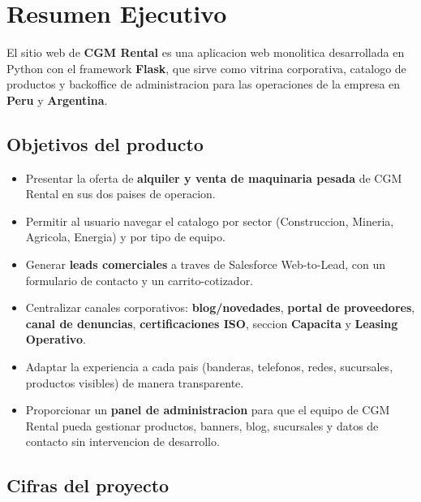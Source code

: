 \documentclass[11pt,a4paper]{article}
\begin{document}
\vspace{0.4cm}
\tableofcontents
\newpage

\section{Resumen Ejecutivo}

El sitio web de \textbf{CGM Rental} es una aplicacion web monolitica
desarrollada en Python con el framework \textbf{Flask}, que sirve como vitrina
corporativa, catalogo de productos y backoffice de administracion para las
operaciones de la empresa en \textbf{Peru} y \textbf{Argentina}.

\subsection{Objetivos del producto}
\begin{itemize}[leftmargin=*]
    \item Presentar la oferta de \textbf{alquiler y venta de maquinaria pesada}
        de CGM Rental en sus dos paises de operacion.
    \item Permitir al usuario navegar el catalogo por sector (Construccion,
        Mineria, Agricola, Energia) y por tipo de equipo.
    \item Generar \textbf{leads comerciales} a traves de Salesforce
        Web-to-Lead, con un formulario de contacto y un carrito-cotizador.
    \item Centralizar canales corporativos: \textbf{blog/novedades},
        \textbf{portal de proveedores}, \textbf{canal de denuncias},
        \textbf{certificaciones ISO}, seccion \textbf{Capacita} y
        \textbf{Leasing Operativo}.
    \item Adaptar la experiencia a cada pais (banderas, telefonos, redes,
        sucursales, productos visibles) de manera transparente.
    \item Proporcionar un \textbf{panel de administracion} para que el
        equipo de CGM Rental pueda gestionar productos, banners, blog,
        sucursales y datos de contacto sin intervencion de desarrollo.
\end{itemize}

\subsection{Cifras del proyecto}
\end{document}
